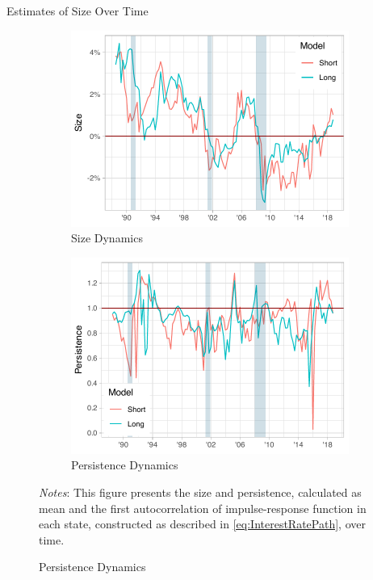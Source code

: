 \documentclass[10pt,aspectratio=169]{beamer}
\begin{document}
\begin{frame}{Estimates of Size Over Time}
    \begin{figure}[!htbp]\centering
        \caption{}
        \label{fig:Size_Persistence_Dynamics}
        \begin{subfigure}[b]{0.49\textwidth}
            \centering
            \caption{Size Dynamics}
            \label{fig:AverageResponce}
            \includegraphics[width=\linewidth]{size_plot.pdf}
        \end{subfigure}%
        \begin{subfigure}[b]{0.49\textwidth}
            \centering
            \caption{Persistence Dynamics}
            \label{fig:DifferentialResponce}
            \includegraphics[width=\linewidth]{persistence_plot.pdf}
        \end{subfigure} \vspace{-5ex}
            {\begin{flushleft}\tiny\textit{Notes}: This figure presents the size and persistence, calculated as mean and the first autocorrelation of impulse-response function in each state, constructed as described in \vref{eq:InterestRatePath}, over time. \end{flushleft}}
      \end{figure}
      
\end{frame}
\end{document}
